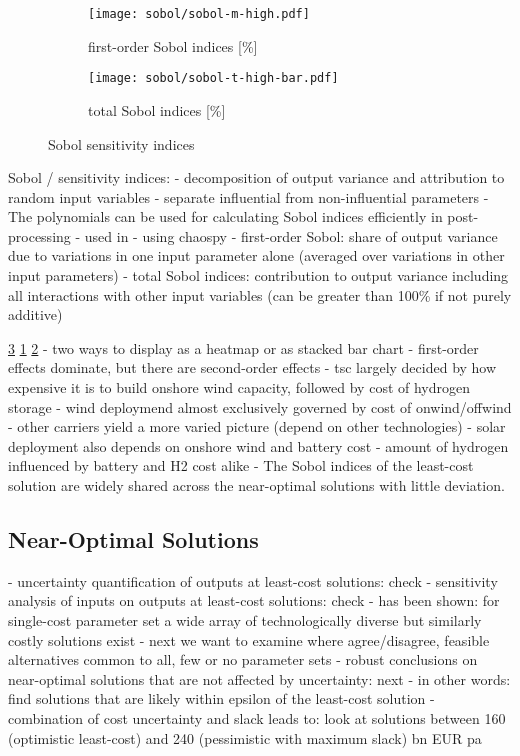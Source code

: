 
\begin{figure}
    \begin{subfigure}[t]{0.45\textwidth}
        \caption{first-order Sobol indices [\%]}
        \label{fig:sobol:first}
        \texttt{[image: sobol/sobol-m-high.pdf]}
    \end{subfigure}
    \begin{subfigure}[t]{0.54\textwidth}
        \caption{total Sobol indices [\%]}
        \label{fig:sobol:total}
        \texttt{[image: sobol/sobol-t-high-bar.pdf]}
    \end{subfigure}
    \caption{Sobol sensitivity indices}
    \label{fig:sobol}
\end{figure}

Sobol / sensitivity indices:
- decomposition of output variance and attribution to random input variables
- separate influential from non-influential parameters
- The polynomials can be used for calculating Sobol indices efficiently in post-processing \cite{sudret_global_2008}
- used in \cite{trondle_trade-offs_2020,mavromatidis_uncertainty_2018}
- using chaospy \cite{feinberg_chaospy_2015}
- first-order Sobol: share of output variance due to variations in one input parameter alone (averaged over variations in other input parameters)
- total Sobol indices: contribution to output variance including all interactions with other input variables (can be greater than 100\% if not purely additive)

\cref{fig:sobol} \cref{fig:sobol:first} \cref{fig:sobol:total}
- two ways to display as a heatmap or as stacked bar chart
- first-order effects dominate, but there are second-order effects
- tsc largely decided by how expensive it is to build onshore wind capacity, followed by cost of hydrogen storage
- wind deploymend almost exclusively governed by cost of onwind/offwind
- other carriers yield a more varied picture (depend on other technologies)
- solar deployment also depends on onshore wind and battery cost
- amount of hydrogen influenced by battery and H2 cost alike
- The Sobol indices of the least-cost solution are widely shared across the near-optimal solutions with little deviation.

\subsection{Near-Optimal Solutions}

- uncertainty quantification of outputs at least-cost solutions: check
- sensitivity analysis of inputs on outputs at least-cost solutions: check
- has been shown: for single-cost parameter set a wide array of technologically diverse but similarly costly solutions exist
- next we want to examine where agree/disagree, feasible alternatives common to all, few or no parameter sets
- robust conclusions on near-optimal solutions that are not affected by uncertainty: next
- in other words: find solutions that are likely within epsilon of the least-cost solution
- combination of cost uncertainty and slack leads to: look at solutions between 160 (optimistic least-cost) and 240 (pessimistic with maximum slack) bn EUR pa

